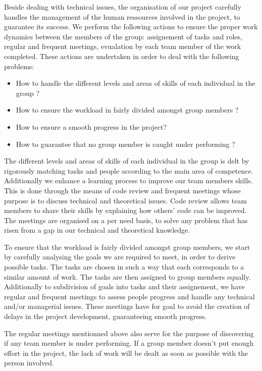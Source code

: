 Beside dealing with technical issues, the organisation of our project carefully handles the management of the human ressources involved in the project, to guarantee its success. We perform the following actions to ensure the proper work dynamics between the members of the group: assignement of tasks and roles, regular and frequent meetings, evualation by each team member of the work completed. These actions are undertaken in order to deal with the following problems:

\begin{itemize}
\item How to handle the different levels and areas of skills of each individual in the group ?
\item How to ensure the workload in fairly divided amongst group members ?
\item How to ensure a smooth progress in the project?
\item How to guarantee that no group member is caught under performing ?
\end{itemize}

The different levels and areas of skills of each individual in the group is delt by rigorously matching tasks and people according to the main area of competence. Additionally we enhance a learning process to improve our team members skills. This is done through the means of code review and frequent meetings whose purpose is to discuss technical and theoretical issues. Code review allows team members to share their skills by explaining how others' code can be improved. The meetings are organised on a per need basis, to solve any problem that has risen from a gap in our technical and theoretical knowledge.

To ensure that the workload is fairly divided amongst group members, we start by carefully analysing the goals we are required to meet, in order to derive possible tasks. The tasks are chosen in such a way that each corresponds to a similar amount of work. The tasks are then assigned to group members equally. Additionally to subdivision of goals into tasks and their assignement, we have regular and frequent meetings to assess people progress and handle any technical and/or managerial issues. These meetings have for goal to avoid the creation of delays in the project development, guaranteeing smooth progress.

The regular meetings mentionned above also serve for the purpose of discovering if any team member is under performing. If a group member doesn't put enough effort in the project, the lack of work will be dealt as soon as possible with the person involved.
